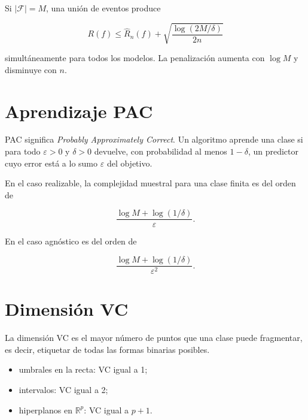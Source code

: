 \documentclass[
  spanish,
  10.5pt,
  letterpaper,
  DIV=11,
  numbers=noendperiod,
  oneside,
  open=any]{scrreprt}
\providecommand{\tightlist}{%
  \setlength{\itemsep}{0pt}\setlength{\parskip}{0pt}}
\theoremstyle{definition}
\theoremstyle{definition}
\theoremstyle{plain}
\theoremstyle{remark}
\begin{document}

Si \(|\mathcal F|=M\), una unión de eventos produce

\[
R(f)\le\widehat R_n(f)+\sqrt{\frac{\log(2M/\delta)}{2n}}
\]

simultáneamente para todos los modelos. La penalización aumenta con
\(\log M\) y disminuye con \(n\).

\section*{\texorpdfstring{Aprendizaje
PAC}{Aprendizaje PAC}}\label{aprendizaje-pac}


PAC significa \emph{Probably Approximately Correct}. Un algoritmo
aprende una clase si para todo \(\varepsilon>0\) y \(\delta>0\)
devuelve, con probabilidad al menos \(1-\delta\), un predictor cuyo
error está a lo sumo \(\varepsilon\) del objetivo.

En el caso realizable, la complejidad muestral para una clase finita es
del orden de

\[
\frac{\log M+\log(1/\delta)}{\varepsilon}.
\]

En el caso agnóstico es del orden de

\[
\frac{\log M+\log(1/\delta)}{\varepsilon^2}.
\]

\section*{\texorpdfstring{Dimensión
VC}{Dimensión VC}}\label{dimensiuxf3n-vc}


La dimensión VC es el mayor número de puntos que una clase puede
fragmentar, es decir, etiquetar de todas las formas binarias posibles.

\begin{itemize}
\tightlist
\item
  umbrales en la recta: VC igual a 1;
\item
  intervalos: VC igual a 2;
\item
  hiperplanos en \(\mathbb R^p\): VC igual a \(p+1\).
\end{itemize}
\end{document}
